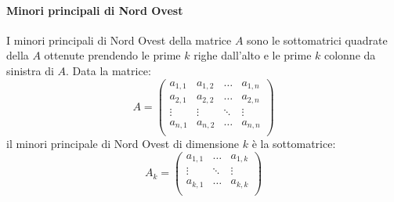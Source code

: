 \documentclass[a4paper,12pt]{article}
\begin{document}
\paragraph{Minori principali di Nord Ovest}
I minori principali di Nord Ovest della matrice $A$ sono le sottomatrici quadrate della $A$ ottenute prendendo le prime $k$ righe dall'alto e le prime $k$ colonne da sinistra di $A$.
Data la matrice:
\begin{displaymath}
A=\left(\begin{array}{cccc}
a_{1,1} & a_{1,2} & \dots &a_{1,n} \\

a_{2,1} & a_{2,2} & \dots &a_{2,n} \\

\vdots & \vdots & \ddots & \vdots \\

a_{n,1} & a_{n,2} & \dots &a_{n,n} \\
\end{array}\right)
\end{displaymath}
il minori principale di Nord Ovest di dimensione $k$ è la sottomatrice:
\begin{displaymath}
A_k=\left(\begin{array}{ccc}
a_{1,1} &  \dots &a_{1,k} \\


\vdots & \ddots & \vdots \\

a_{k,1} & \dots &a_{k,k} \\
\end{array}\right)
\end{displaymath}
\end{document}
